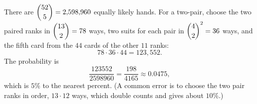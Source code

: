 There are $\dbinom{52}{5}=2{,}598{,}960$ equally likely hands. For a two-pair, choose the two paired ranks in $\dbinom{13}{2}=78$ ways, two suits for each pair in $\dbinom42^2=36$ ways, and the fifth card from the $44$ cards of the other $11$ ranks:
\[78\cdot36\cdot44=123{,}552.\]
The probability is
\[\dfrac{123552}{2598960}=\dfrac{198}{4165}\approx 0.0475,\]
which is $\boxed{5\%}$ to the nearest percent. (A common error is to choose the two pair ranks in order, $13\cdot12$ ways, which double counts and gives about $10\%$.)
